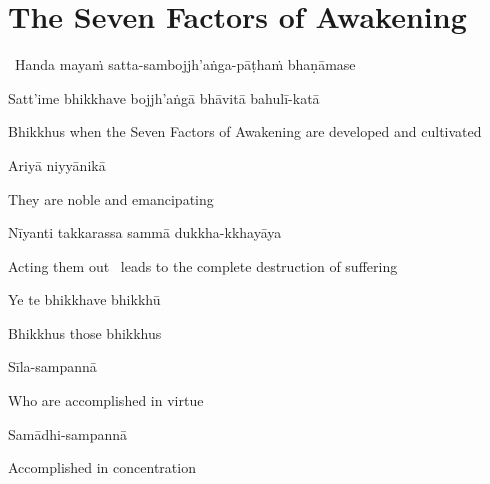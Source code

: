 \suttaRef{[DN 16]}

\ifdigital{}\fi



\section{The Seven Factors of Awakening}
\label{seven-factors-of-awakening}

\begin{leader}
  \anglebracketleft\ \hspace{-0.5mm}Handa mayaṁ satta-sambojjh'aṅga-pāṭhaṁ \mbox{bhaṇāmase}~\hspace{-0.5mm}\anglebracketright\
\end{leader}

Satt'ime bhikkhave bojjh'aṅgā bhāvitā bahulī-katā

\begin{english-hang}
  Bhikkhus when the Seven Factors of Awakening are developed and cultivated
\end{english-hang}

Ariyā niyyānikā

\begin{english}
  They are noble and emancipating
\end{english}

Nīyanti takkarassa sammā dukkha-kkhayāya

\begin{english-hang}
  Acting them out \breathmark\ leads to the complete destruction of suffering
\end{english-hang}

\suttaRef{[SN 46.19]}

Ye te bhikkhave bhikkhū

\begin{english}
  Bhikkhus those bhikkhus
\end{english}

Sīla-sampannā

\begin{english}
  Who are accomplished in virtue
\end{english}

Samādhi-sampannā

\begin{english}
  Accomplished in concentration
\end{english}

\ifninebythirteen\clearpage\fi

